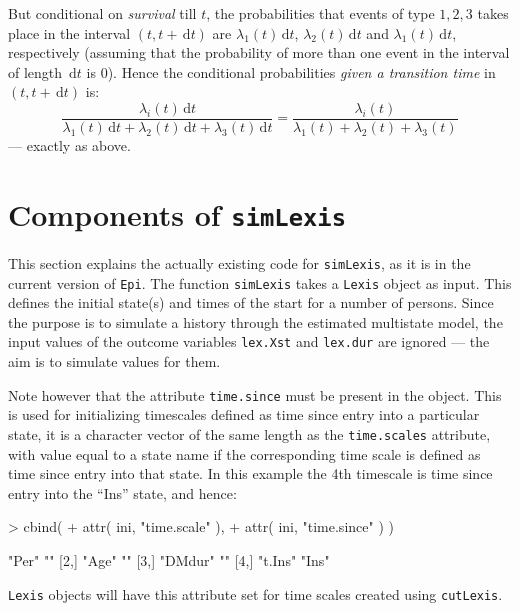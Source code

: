 \documentclass[a4paper,twoside,12pt]{report}
\providecommand{\dif}{{\,\mathrm d}}
\begin{document}
\begin{enumerate}
\begin{enumerate}
    But conditional on \emph{survival} till $t$, the probabilities
    that events of type $1,2,3$ takes place in the interval $(t,t+\dif
    t)$ are $\lambda_1(t)\dif t$, $\lambda_2(t)\dif t$ and
    $\lambda_1(t)\dif t$, respectively (assuming that the probability
    of more than one event in the interval of length $\dif t$ is
    0). Hence the conditional probabilities \emph{given a transition
      time} in $(t,t+\dif t)$ is:
    \[
    \frac{\lambda_i(t)\dif t}{\lambda_1(t)\dif t+\lambda_2(t)\dif t+\lambda_3(t)\dif t}=
    \frac{\lambda_i(t)}{\lambda_1(t)+\lambda_2(t)+\lambda_3(t)}
    \]
    --- exactly as above.
  \end{enumerate}
\end{enumerate}

\section{Components of \texttt{simLexis}}

This section explains the actually existing code for
\texttt{simLexis}, as it is in the current version of \texttt{Epi}.
The function \texttt{simLexis} takes a \texttt{Lexis} object as
input. This defines the initial state(s) and times of the start for a
number of persons. Since the purpose is to simulate a history through
the estimated multistate model, the input values of the outcome
variables \texttt{lex.Xst} and \texttt{lex.dur} are ignored --- the
aim is to simulate values for them.

Note however that the attribute \texttt{time.since} must be present in the
object. This is used for initializing timescales defined as time since
entry into a particular state, it is a character vector of the same
length as the \texttt{time.scales} attribute, with value equal to a
state name if the corresponding time scale is defined as time since
entry into that state. In this example the 4th timescale is time since
entry into the ``Ins'' state, and hence:
\begin{Schunk}
\begin{Sinput}
> cbind(
+ attr( ini, "time.scale" ),
+ attr( ini, "time.since" ) )
\end{Sinput}
\begin{Soutput}
     [,1]    [,2] 
[1,] "Per"   ""   
[2,] "Age"   ""   
[3,] "DMdur" ""   
[4,] "t.Ins" "Ins"
\end{Soutput}
\end{Schunk}
\texttt{Lexis} objects will have this attribute set for time scales created
using \texttt{cutLexis}.
\end{document}
